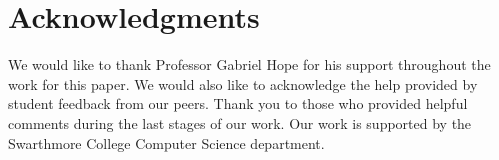 \documentclass{article}
\begin{document}
\section*{Acknowledgments}

We would like to thank Professor Gabriel Hope for his support throughout the work for this 
paper. We would also like to acknowledge the help provided by student feedback from our peers. 
Thank you to those who provided helpful comments during the last stages of our work. Our work
is supported by the Swarthmore College Computer Science department. 


\nocite{*}



\end{document}
